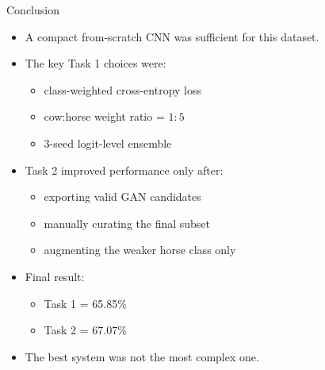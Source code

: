 \documentclass[aspectratio=169]{beamer}
\begin{document}
\begin{frame}{Conclusion}
\small
\begin{itemize}
  \item A compact from-scratch CNN was sufficient for this dataset.
  \item The key Task 1 choices were:
  \begin{itemize}
    \item class-weighted cross-entropy loss
    \item cow:horse weight ratio = $1:5$
    \item 3-seed logit-level ensemble
  \end{itemize}
  \item Task 2 improved performance only after:
  \begin{itemize}
    \item exporting valid GAN candidates
    \item manually curating the final subset
    \item augmenting the weaker horse class only
  \end{itemize}
  \item Final result:
  \begin{itemize}
    \item Task 1 = 65.85\%
    \item Task 2 = 67.07\%
  \end{itemize}
  \item The best system was not the most complex one.
\end{itemize}
\end{frame}
\end{document}
